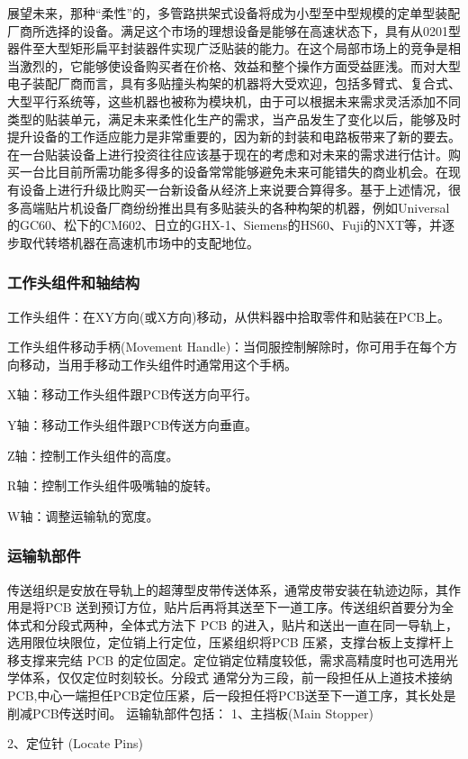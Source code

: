 \documentclass[a4paper]{article}%
\begin{document}
\begin{CJK}{UTF8}{gbsn}
展望未来，那种“柔性”的，多管路拱架式设备将成为小型至中型规模的定单型装配厂商所选择的设备。满足这个市场的理想设备是能够在高速状态下，具有从0201型器件至大型矩形扁平封装器件实现广泛贴装的能力。在这个局部市场上的竞争是相当激烈的，它能够使设备购买者在价格、效益和整个操作方面受益匪浅。而对大型电子装配厂商而言，具有多贴撞头构架的机器将大受欢迎，包括多臂式、复合式、大型平行系统等，这些机器也被称为模块机，由于可以根据未来需求灵活添加不同类型的贴装单元，满足未来柔性化生产的需求，当产品发生了变化以后，能够及时提升设备的工作适应能力是非常重要的，因为新的封装和电路板带来了新的要去。在一台贴装设备上进行投资往往应该基于现在的考虑和对未来的需求进行估计。购买一台比目前所需功能多得多的设备常常能够避免未来可能错失的商业机会。在现有设备上进行升级比购买一台新设备从经济上来说要合算得多。基于上述情况，很多高端贴片机设备厂商纷纷推出具有多贴装头的各种构架的机器，例如Universal的GC60、松下的CM602、日立的GHX-1、Siemens的HS60、Fuji的NXT等，并逐步取代转塔机器在高速机市场中的支配地位。
\subsubsection{工作头组件和轴结构}
工作头组件：在XY方向(或X方向)移动，从供料器中拾取零件和贴装在PCB上。

工作头组件移动手柄(Movement Handle)：当伺服控制解除时，你可用手在每个方向移动，当用手移动工作头组件时通常用这个手柄。

X轴：移动工作头组件跟PCB传送方向平行。

Y轴：移动工作头组件跟PCB传送方向垂直。

Z轴：控制工作头组件的高度。

R轴：控制工作头组件吸嘴轴的旋转。

W轴：调整运输轨的宽度。
\subsubsection{运输轨部件}
传送组织是安放在导轨上的超薄型皮带传送体系，通常皮带安装在轨迹边际，其作用是将PCB 送到预订方位，贴片后再将其送至下一道工序。传送组织首要分为全体式和分段式两种，全体式方法下 PCB 的进入，贴片和送出一直在同一导轨上，选用限位块限位，定位销上行定位，压紧组织将PCB 压紧，支撑台板上支撑杆上移支撑来完结 PCB 的定位固定。定位销定位精度较低，需求高精度时也可选用光学体系，仅仅定位时刻较长。分段式 通常分为三段，前一段担任从上道技术接纳PCB,中心一端担任PCB定位压紧，后一段担任将PCB送至下一道工序，其长处是削减PCB传送时间。
运输轨部件包括：
1、主挡板(Main Stopper)

2、定位针 (Locate Pins)


\end{CJK}
\end{document}
